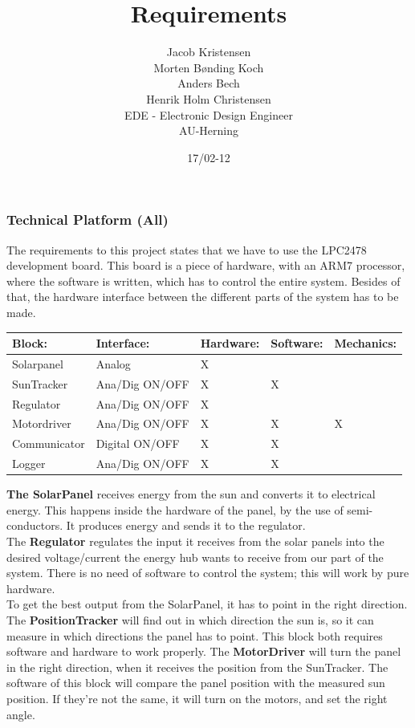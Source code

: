 \documentclass[12pt,a4paper]{report}
\title{Requirements}
\author{Jacob Kristensen\\Morten Bønding Koch\\Anders Bech\\ Henrik Holm Christensen\\EDE - Electronic Design Engineer\\AU-Herning\\}
\date{17/02-12}
\begin{document}
\subsubsection{Technical Platform (All)}
The requirements to this project states that we have to use the LPC2478 development board. This board is a piece of hardware, with an ARM7 processor, where the software is written, which has to control the entire system. Besides of that, the hardware interface between the different parts of the system has to be made. 

\begin{tabular}{|p{3cm}|p{3cm}|p{3cm}|p{3cm}|p{3cm}|}
\hline	Block: & Interface: & Hardware: & Software: & Mechanics: \\ 
\hline 	Solarpanel	& Analog & X &  &  \\ 
\hline	SunTracker	& Ana/Dig \newline ON/OFF & X & X &  \\ 
\hline 	Regulator	& Ana/Dig \newline ON/OFF & X &  &  \\ 
\hline 	Motordriver	& Ana/Dig \newline ON/OFF & X & X & X \\ 
\hline 	Communicator& Digital \newline ON/OFF & X & X &  \\ 
\hline 	Logger	& Ana/Dig \newline ON/OFF & X & X & \\
\hline
\end{tabular} 






\textbf{The SolarPanel} receives energy from the sun and converts it to electrical energy. This happens inside the hardware of the panel, by the use of semi-conductors. It produces energy and sends it to the regulator.\\

The \textbf{Regulator} regulates the input it receives from the solar panels into the desired voltage/current the energy hub wants to receive from our part of the system. There is no need of software to control the system; this will work by pure hardware. \\

To get the best output from the SolarPanel, it has to point in the right direction. The \textbf{PositionTracker} will find out in which direction the sun is, so it can measure in which directions the panel has to point. This block both requires software and hardware to work properly. 
The \textbf{MotorDriver} will turn the panel in the right direction, when it receives the position from the SunTracker. The software of this block will compare the panel position with the measured sun position. If they're not the same, it will turn on the motors, and set the right angle.\\
\end{document}
